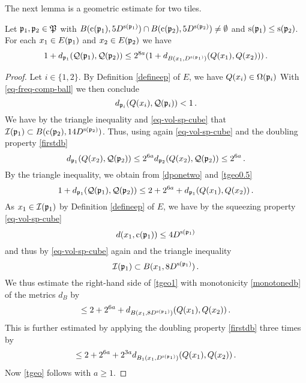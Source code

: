 The next lemma is a geometric estimate for two tiles.
\begin{lemma}\label{tile-uncertainty}
\leanok
{}
    Let ${\mathfrak p}_1, {\mathfrak p}_2\in {\mathfrak P}$ with
    $B({\mathrm{c}}({\mathfrak p}_1),5D^{{\mathrm{s}}({\mathfrak p}_1)}) \cap B({\mathrm{c}}({\mathfrak p}_2),5D^{{\mathrm{s}}({\mathfrak p}_2)}) \ne \emptyset$ and
${\mathrm{s}}({{\mathfrak p}_1})\leq {\mathrm{s}}({{\mathfrak p}_2})$. For each $x_1\in E({\mathfrak p}_1)$ and
$x_2\in E({\mathfrak p}_2)$ we have
\begin{equation}\label{tgeo}
  1+d_{{\mathfrak p}_1}({\mathcal{Q}}({\mathfrak p}_1), {\mathcal{Q}}({\mathfrak p}_2))\le
    2^{8a}(1 + d_{B(x_1, D^{{\mathrm{s}}({\mathfrak p}_1)})}({Q}(x_1),{Q}(x_2)))\, .
\end{equation}
\end{lemma}
\begin{proof}
\leanok
Let $i\in \{1,2\}$.
By Definition \eqref{defineep} of $E$,
we have ${Q}(x_i)\in {\Omega}({\mathfrak p}_i)$
With \eqref{eq-freq-comp-ball} we then conclude
\begin{equation}\label{dponetwo}
    d_{{\mathfrak p}_i}({Q}(x_i),{\mathcal{Q}}({\mathfrak p}_i)) < 1\, .
\end{equation}
We have by the triangle inequality and \eqref{eq-vol-sp-cube} that ${\mathcal{I}}({\mathfrak p}_1) \subset B({\mathrm{c}}({\mathfrak p}_2),14D^{{\mathrm{s}}({\mathfrak p}_2)})$.
Thus, using again \eqref{eq-vol-sp-cube} and the doubling property \eqref{firstdb}
\begin{equation}\label{tgeo0.5}
    d_{{\mathfrak p}_1}({Q}(x_2), {\mathcal{Q}}({\mathfrak p}_2)) \le 2^{6a} d_{{\mathfrak p}_2}({Q}(x_2), {\mathcal{Q}}({\mathfrak p}_2)) \le 2^{6a}\,.
\end{equation}
By the triangle inequality, we obtain from \eqref{dponetwo} and
\eqref{tgeo0.5}
\begin{equation}\label{tgeo1}
     1+d_{{\mathfrak p}_1}({\mathcal{Q}}({\mathfrak p}_1), {\mathcal{Q}}({\mathfrak p}_2))\le 2 + 2^{6a} +d_{{\mathfrak p}_1}({Q}(x_1), {Q}(x_2))\, .
\end{equation}
As $x_1\in {\mathcal{I}}({\mathfrak p}_1)$ by Definition \eqref{defineep} of $E$, we have by the squeezing property \eqref{eq-vol-sp-cube}
\begin{equation}
    d(x_1,{\mathrm{c}}({\mathfrak p}_1))\le 4D^{{\mathrm{s}}({\mathfrak p}_1)}
\end{equation}
and thus by \eqref{eq-vol-sp-cube} again and the triangle inequality
\begin{equation}
    {\mathcal{I}}({\mathfrak p}_1)\subset B(x_1,8D^{{\mathrm{s}}({\mathfrak p}_1)})\, .
\end{equation}
We thus estimate the right-hand side of \eqref{tgeo1} with monotonicity \eqref{monotonedb} of the metrics $d_B$ by
\begin{equation}\label{tgeo1.5}
    \le 2 + 2^{6a} + d_{B(x_1,8D^{{\mathrm{s}}({\mathfrak p}_1)})}({Q}(x_1), {Q}(x_2))\, .
\end{equation}
This is further estimated by applying the doubling property \eqref{firstdb} three times by
\begin{equation}\label{tgeo2}
    \le 2 + 2^{6a} +2^{3a}d_{B_1(x_1, D^{{\mathrm{s}}({\mathfrak p}_1)})}({Q}(x_1), {Q}(x_2))\, .
\end{equation}
Now \eqref{tgeo} follows with $a\ge 1$.
\end{proof}


